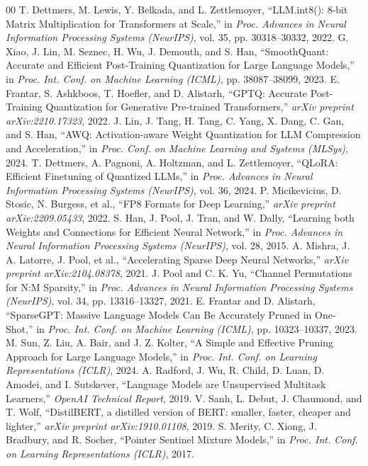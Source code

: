 \documentclass[conference]{IEEEtran}
\begin{document}
\begin{thebibliography}{00}
 T. Dettmers, M. Lewis, Y. Belkada, and L. Zettlemoyer, ``LLM.int8(): 8-bit Matrix Multiplication for Transformers at Scale,'' in \textit{Proc. Advances in Neural Information Processing Systems (NeurIPS)}, vol. 35, pp. 30318--30332, 2022.
 G. Xiao, J. Lin, M. Seznec, H. Wu, J. Demouth, and S. Han, ``SmoothQuant: Accurate and Efficient Post-Training Quantization for Large Language Models,'' in \textit{Proc. Int. Conf. on Machine Learning (ICML)}, pp. 38087--38099, 2023.
 E. Frantar, S. Ashkboos, T. Hoefler, and D. Alistarh, ``GPTQ: Accurate Post-Training Quantization for Generative Pre-trained Transformers,'' \textit{arXiv preprint arXiv:2210.17323}, 2022.
 J. Lin, J. Tang, H. Tang, C. Yang, X. Dang, C. Gan, and S. Han, ``AWQ: Activation-aware Weight Quantization for LLM Compression and Acceleration,'' in \textit{Proc. Conf. on Machine Learning and Systems (MLSys)}, 2024.
 T. Dettmers, A. Pagnoni, A. Holtzman, and L. Zettlemoyer, ``QLoRA: Efficient Finetuning of Quantized LLMs,'' in \textit{Proc. Advances in Neural Information Processing Systems (NeurIPS)}, vol. 36, 2024.
 P. Micikevicius, D. Stosic, N. Burgess, et al., ``FP8 Formats for Deep Learning,'' \textit{arXiv preprint arXiv:2209.05433}, 2022.
 S. Han, J. Pool, J. Tran, and W. Dally, ``Learning both Weights and Connections for Efficient Neural Network,'' in \textit{Proc. Advances in Neural Information Processing Systems (NeurIPS)}, vol. 28, 2015.
 A. Mishra, J. A. Latorre, J. Pool, et al., ``Accelerating Sparse Deep Neural Networks,'' \textit{arXiv preprint arXiv:2104.08378}, 2021.
 J. Pool and C. K. Yu, ``Channel Permutations for N:M Sparsity,'' in \textit{Proc. Advances in Neural Information Processing Systems (NeurIPS)}, vol. 34, pp. 13316--13327, 2021.
 E. Frantar and D. Alistarh, ``SparseGPT: Massive Language Models Can Be Accurately Pruned in One-Shot,'' in \textit{Proc. Int. Conf. on Machine Learning (ICML)}, pp. 10323--10337, 2023.
 M. Sun, Z. Liu, A. Bair, and J. Z. Kolter, ``A Simple and Effective Pruning Approach for Large Language Models,'' in \textit{Proc. Int. Conf. on Learning Representations (ICLR)}, 2024.
 A. Radford, J. Wu, R. Child, D. Luan, D. Amodei, and I. Sutskever, ``Language Models are Unsupervised Multitask Learners,'' \textit{OpenAI Technical Report}, 2019.
 V. Sanh, L. Debut, J. Chaumond, and T. Wolf, ``DistilBERT, a distilled version of BERT: smaller, faster, cheaper and lighter,'' \textit{arXiv preprint arXiv:1910.01108}, 2019.
 S. Merity, C. Xiong, J. Bradbury, and R. Socher, ``Pointer Sentinel Mixture Models,'' in \textit{Proc. Int. Conf. on Learning Representations (ICLR)}, 2017.
\end{thebibliography}
\end{document}
